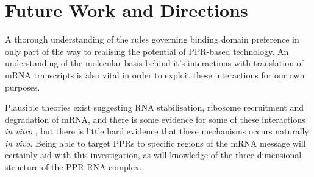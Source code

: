 \section{Future Work and Directions}

A thorough understanding of the rules governing binding domain preference in
only part of the way to realising the potential of PPR-based technology.
An understanding of the molecular basis behind it's interactions with
translation of mRNA transcripts is also vital in order to exploit these
interactions for our own purposes.

Plausible theories exist suggesting RNA stabilisation, ribosome recruitment and
degradation of mRNA, and there is some evidence for some of these interactions
\emph{in vitro} \citep[see][]{Prikryl2011}, but there is little hard evidence 
that these mechanisms occurs naturally \emph{in vivo}.
Being able to target PPRs to specific regions of the mRNA message will
certainly aid with this investigation, as will knowledge of the three
dimensional structure of the PPR-RNA complex.

